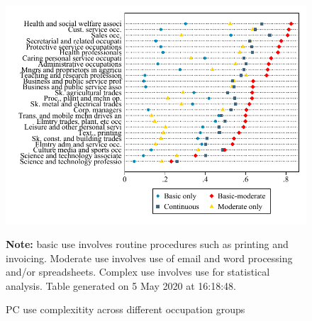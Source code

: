 \begin{figure}[!h]
\caption{PC use complexitity across different occupation groups}
\label{fig:pccomparison}
\includegraphics[width=\textwidth]{../output/occRankingComparison}
\par \begin{minipage}[h]{\textwidth}{\scriptsize\textbf{Note:} basic use involves routine procedures such as printing and invoicing. Moderate use involves use of email and word processing and/or spreadsheets. Complex use involves use for statistical analysis. Table generated on  5 May 2020 at 16:18:48.}\end{minipage}
\end{figure}
